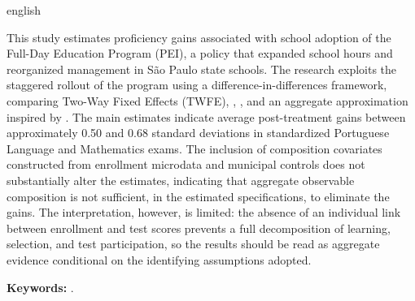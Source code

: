 ﻿\begin{resumo}[Abstract]
\begin{otherlanguage*}{english}

This study estimates proficiency gains associated with school adoption of the Full-Day Education Program (PEI), a policy that expanded school hours and reorganized management in São Paulo state schools. The research exploits the staggered rollout of the program using a difference-in-differences framework, comparing Two-Way Fixed Effects (TWFE), \textcite{callawaysantanna}, \textcite{santannazhao}, and an aggregate approximation inspired by \textcite{santannaxu}. The main estimates indicate average post-treatment gains between approximately 0.50 and 0.68 standard deviations in standardized Portuguese Language and Mathematics exams. The inclusion of composition covariates constructed from enrollment microdata and municipal controls does not substantially alter the estimates, indicating that aggregate observable composition is not sufficient, in the estimated specifications, to eliminate the gains. The interpretation, however, is limited: the absence of an individual link between enrollment and test scores prevents a full decomposition of learning, selection, and test participation, so the results should be read as aggregate evidence conditional on the identifying assumptions adopted.

\textbf{Keywords:} \thekeywordsabstract.
\end{otherlanguage*}
\end{resumo}
